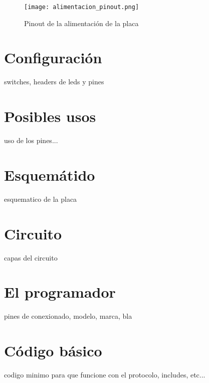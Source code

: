 \documentclass[a4paper,10pt]{article}
\begin{document}
\begin{figure}
\centering
\texttt{[image: alimentacion\_pinout.png]}
\caption{Pinout de la alimentaci\'on de la placa}
\label{alimentacion_pinout}
\end{figure}

\section{Configuraci\'on}
\label{configuracion}

switches, headers de leds y pines

\section{Posibles usos}
\label{usos}

uso de los pines...

\section{Esquem\'atido}
\label{esquematico}

esquematico de la placa

\section{Circuito}
\label{circuito}

capas del circuito

\section{El programador}
\label{programador}

pines de conexionado, modelo, marca, bla

\section{C\'odigo b\'asico}
\label{codigo}

codigo minimo para que funcione con el protocolo, includes, etc...
\end{document}
